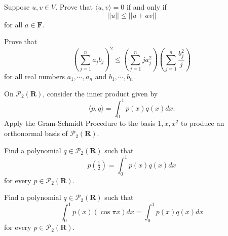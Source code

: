 \documentclass[12pt,letterpaper,boxed]{hmcpset}
\begin{document}

\begin{problem}[6]
Suppose $ u, v \in V $. Prove that $ \langle u,v \rangle = 0 $ if and only if $$ ||u|| \leq ||u+av|| $$ for all $ a \in \textbf{F} $.
\end{problem}

\begin{solution}

\end{solution}

\clearpage

\begin{problem}[15]
Prove that $$ \left( \sum_{j=1}^n a_jb_j \right)^2 \leq \left( \sum_{j=1}^n ja_j^2 \right) \left( \sum_{j=1}^n \frac{b_j^2}{j} \right) $$ for all real numbers $ a_1,\cdots,a_n $ and $ b_1,\cdots,b_n $.
\end{problem}

\begin{solution}
\end{solution}

\clearpage

\begin{problem}[5]
On $ \mathcal{P}_2(\textbf{R}) $, consider the inner product given by $$ \langle p,q \rangle = \int_{0}^{1} p(x)q(x)dx. $$ Apply the Gram-Schmidt Procedure to the basis $ 1,x,x^2 $ to produce an orthonormal basis of $ \mathcal{P}_2(\textbf{R}) $.
\end{problem}

\begin{solution}
\end{solution}

\clearpage


\begin{problem}[7]
Find a polynomial $ q \in \mathcal{P}_2(\textbf{R}) $ such that $$ p(\tfrac{1}{2}) = \int_{0}^{1} p(x)q(x)dx $$ for every $ p \in \mathcal{P}_2(\textbf{R}) $.
\end{problem}

\begin{solution}
\end{solution}

\clearpage

\begin{problem}[8]
Find a polynomial $ q \in \mathcal{P}_2(\textbf{R}) $ such that $$ \int_{0}^{1} p(x)(\cos \pi x)dx = \int_{0}^{1} p(x)q(x)dx $$ for every $ p \in \mathcal{P}_2(\textbf{R}) $.
\end{problem}

\begin{solution}

\end{solution}
\end{document}
